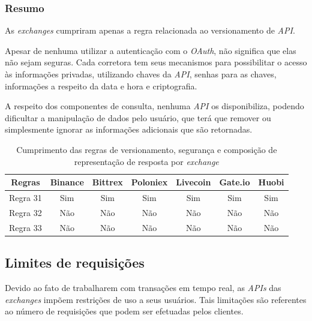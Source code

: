 \subsubsection{Resumo}

As \textit{exchanges} cumpriram apenas a regra relacionada ao versionamento de \textit{API}.

Apesar de nenhuma utilizar a autenticação com o \textit{OAuth}, não significa que elas não sejam seguras. Cada corretora tem seus mecanismos para possibilitar o acesso às informações privadas, utilizando chaves da \textit{API}, senhas para as chaves, informações a respeito da data e hora e criptografia.

A respeito dos componentes de consulta, nenhuma \textit{API} os disponibiliza, podendo dificultar a manipulação de dados pelo usuário, que terá que remover ou simplesmente ignorar as informações adicionais que são retornadas.

\begin{table}[h]
    \centering
    \begin{tabular}{|c|c|c|c|c|c|c|}
        \hline
        \textbf{Regras} & \textbf{Binance} & \textbf{Bittrex} & \textbf{Poloniex} & \textbf{Livecoin} & \textbf{Gate.io} & \textbf{Huobi} \\ \hline
        Regra 31        & Sim                & Sim                & Sim                 & Sim                 & Sim                & Sim              \\ \hline
        Regra 32        & Não                & Não                & Não                 & Não                 & Não                & Não              \\ \hline
        Regra 33        & Não                & Não                & Não                 & Não                 & Não                & Não              \\ \hline
    \end{tabular}
    \caption{Cumprimento das regras de versionamento, segurança e composição de representação de resposta por \textit{exchange}}
    \label{tab:table-7}
\end{table}

\subsection{Limites de requisições}

Devido ao fato de trabalharem com transações em tempo real, as \textit{APIs} das \textit{exchanges} impõem restrições de uso a seus usuários. Tais limitações são referentes ao número de requisições que podem ser efetuadas pelos clientes.

